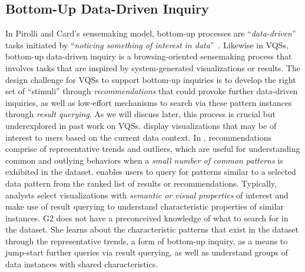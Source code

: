    \subsection{Bottom-Up Data-Driven Inquiry}%
   In Pirolli and Card's sensemaking model, bottom-up processes are ``\textit{data-driven}'' tasks initiated by ``\textit{noticing something of interest in data}''~\cite{Pirolli}. Likewise in VQSs, bottom-up data-driven inquiry is a browsing-oriented sensemaking process that involves tasks that are inspired by system-generated visualizations or results. The design challenge for VQSs to support bottom-up inquiries is to develop the right set of ``stimuli'' through \textit{recommendations} that could provoke further data-driven inquiries, as well as low-effort mechanisms to search via these pattern instances through \textit{result querying}. As we will discuss later, this process is crucial but underexplored in past work on VQSs. %
    display visualizations that may be of interest to users based on the current data context. In \zvpp, recommendations comprise of representative trends and outliers, which are useful for understanding common and outlying behaviors when a \emph{small number of common patterns} is exhibited in the dataset. %
    enables users to query for patterns similar to a selected data pattern from the ranked list of results or recommendations. Typically, analysts select visualizations with \emph{semantic or visual properties} of interest and make use of result querying to understand characteristic properties of similar instances.
    G2 does not have a preconceived knowledge of what to search for in the dataset. She learns about the characteristic patterns that exist in the dataset through the representative trends, a form of bottom-up inquiry, as a means to jump-start further queries via result querying, as well as understand groups of data instances with shared characteristics.
